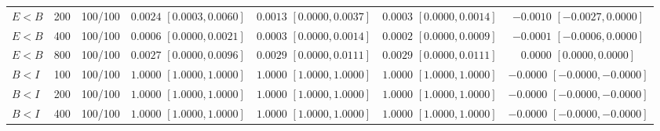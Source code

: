 \documentclass[12pt,letterpaper]{article}
\theoremstyle{plain}
\theoremstyle{definition}
\begin{document}
\begin{table}[p]
\begin{adjustbox}{max width=\linewidth}
\begin{tabular}{lrccccc}
$E<B$ & 200 & 100/100 & \shortstack{$0.0024$\\{\scriptsize$[0.0003,0.0060]$}} & \shortstack{$0.0013$\\{\scriptsize$[0.0000,0.0037]$}} & \shortstack{$0.0003$\\{\scriptsize$[0.0000,0.0014]$}} & \shortstack{$-0.0010$\\{\scriptsize$[-0.0027,0.0000]$}}\\
$E<B$ & 400 & 100/100 & \shortstack{$0.0006$\\{\scriptsize$[0.0000,0.0021]$}} & \shortstack{$0.0003$\\{\scriptsize$[0.0000,0.0014]$}} & \shortstack{$0.0002$\\{\scriptsize$[0.0000,0.0009]$}} & \shortstack{$-0.0001$\\{\scriptsize$[-0.0006,0.0000]$}}\\
$E<B$ & 800 & 100/100 & \shortstack{$0.0027$\\{\scriptsize$[0.0000,0.0096]$}} & \shortstack{$0.0029$\\{\scriptsize$[0.0000,0.0111]$}} & \shortstack{$0.0029$\\{\scriptsize$[0.0000,0.0111]$}} & \shortstack{$0.0000$\\{\scriptsize$[0.0000,0.0000]$}}\\
\addlinespace
$B<I$ & 100 & 100/100 & \shortstack{$1.0000$\\{\scriptsize$[1.0000,1.0000]$}} & \shortstack{$1.0000$\\{\scriptsize$[1.0000,1.0000]$}} & \shortstack{$1.0000$\\{\scriptsize$[1.0000,1.0000]$}} & \shortstack{$-0.0000$\\{\scriptsize$[-0.0000,-0.0000]$}}\\
$B<I$ & 200 & 100/100 & \shortstack{$1.0000$\\{\scriptsize$[1.0000,1.0000]$}} & \shortstack{$1.0000$\\{\scriptsize$[1.0000,1.0000]$}} & \shortstack{$1.0000$\\{\scriptsize$[1.0000,1.0000]$}} & \shortstack{$-0.0000$\\{\scriptsize$[-0.0000,-0.0000]$}}\\
$B<I$ & 400 & 100/100 & \shortstack{$1.0000$\\{\scriptsize$[1.0000,1.0000]$}} & \shortstack{$1.0000$\\{\scriptsize$[1.0000,1.0000]$}} & \shortstack{$1.0000$\\{\scriptsize$[1.0000,1.0000]$}} & \shortstack{$-0.0000$\\{\scriptsize$[-0.0000,-0.0000]$}}\\

\end{tabular}
\end{adjustbox}
\end{table}
\end{document}
